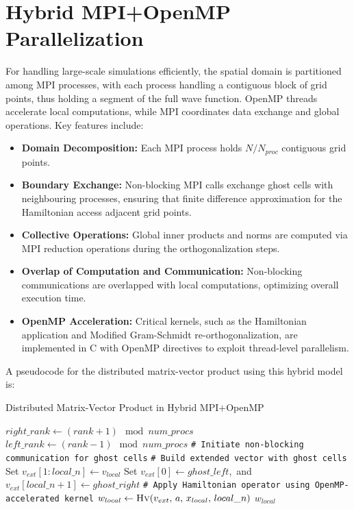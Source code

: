\documentclass[12pt,a4paper]{report}
\begin{document}
\section{Hybrid MPI+OpenMP Parallelization}
For handling large-scale simulations efficiently, the spatial domain is partitioned among MPI processes, with each process handling a contiguous block of grid points, thus holding a segment of the full wave function. OpenMP threads accelerate local computations, while MPI coordinates data exchange and global operations. Key features include:
\begin{itemize} 
    \item \textbf{Domain Decomposition:} Each MPI process holds $N/N_{proc}$ contiguous grid points.
    \item \textbf{Boundary Exchange:} Non-blocking MPI calls exchange ghost cells with neighbouring processes, ensuring that finite difference approximation for the Hamiltonian access adjacent grid points.
    \item \textbf{Collective Operations:} Global inner products and norms are computed via MPI reduction operations during the orthogonalization steps.
    \item \textbf{Overlap of Computation and Communication:} Non-blocking communications are overlapped with local computations, optimizing overall execution time. 
    \item \textbf{OpenMP Acceleration:} Critical kernels, such as the Hamiltonian application and Modified Gram-Schmidt re-orthogonalization, are implemented in C with OpenMP directives to exploit thread-level parallelism.
\end{itemize}
A pseudocode for the distributed matrix-vector product using this hybrid model is:
\begin{algorithm}
\caption{Distributed Matrix-Vector Product in Hybrid MPI$+$OpenMP}
\begin{algorithmic}[1]
    \State $right\_{rank} \gets (rank+1)\mod num\_{procs}$
    \State $left\_{rank} \gets (rank-1)\mod num\_{procs}$
    \State \texttt{\# Initiate non-blocking communication for ghost cells}
    \State {}
    \State {}
    \State {}
    \State {}
    \State {}
    \State \texttt{\# Build extended vector with ghost cells}
    \State Set $v_{ext}[1:local\_{n}] \gets v_{local}$
    \State Set $v_{ext}[0] \gets ghost\_{left}$,\, and $v_{ext}[local\_{n}+1] \gets ghost\_{right}$
    \State \texttt{\# Apply Hamiltonian operator using OpenMP-accelerated kernel}
    \State $w_{local} \gets \Call{Hv}{v_{ext},\, a,\, x_{local},\, local\_{n}}$
    \State \Return $w_{local}$
\EndProcedure
\end{algorithmic}
\end{algorithm}
\end{document}
